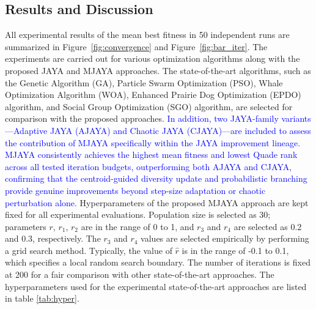 \documentclass[3p,twocolumn]{elsarticle}
\theoremstyle{thmstyleone}%
\theoremstyle{thmstyletwo}%
\theoremstyle{thmstylethree}%
\begin{document}
\subsection{Results and Discussion}
All experimental results of the mean best fitness in 50 independent runs are summarized in Figure~\ref{fig:convergence} and Figure~\ref{fig:bar_iter}. The experiments are carried out for various optimization algorithms along with the proposed JAYA and MJAYA approaches. The state-of-the-art algorithms, such as the Genetic Algorithm (GA), Particle Swarm Optimization (PSO), Whale Optimization Algorithm (WOA), Enhanced Prairie Dog Optimization (EPDO) algorithm, and Social Group Optimization (SGO) algorithm, are selected for comparison with the proposed approaches. \textcolor{blue}{In addition, two JAYA-family variants---Adaptive JAYA (AJAYA) and Chaotic JAYA (CJAYA)---are included to assess the contribution of MJAYA specifically within the JAYA improvement lineage. MJAYA consistently achieves the highest mean fitness and lowest Quade rank across all tested iteration budgets, outperforming both AJAYA and CJAYA, confirming that the centroid-guided diversity update and probabilistic branching provide genuine improvements beyond step-size 
adaptation or chaotic perturbation alone.} 
Hyperparameters of the proposed MJAYA approach are kept fixed for all experimental evaluations. Population size is selected as 30; parameters $r$, $r_1$, $r_2$ are in the range of 0 to 1, and $r_3$ and $r_4$ are selected as 0.2 and 0.3, respectively. The $r_3$ and $r_4$ values are selected empirically by performing a grid search method. Typically, the value of $\hat{r}$ is in the range of -0.1 to 0.1, which specifies a local random search boundary. The number of iterations is fixed at 200 for a fair comparison with other state-of-the-art approaches. The hyperparameters used for the experimental state-of-the-art approaches are listed in table \ref{tab:hyper}.
\end{document}
